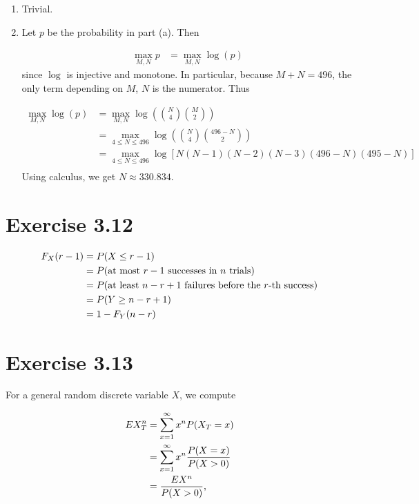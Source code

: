 \documentclass[12pt,letterpaper,reqno]{amsart}
\numberwithin{equation}{subsection}
\begin{document}
\begin{enumerate}[label=(\alph*),leftmargin=*]
    \item Trivial.
    
    \item Let $p$ be the probability in part (a). Then
    
    \begin{align*}
        \max_{M,N} p &= \max_{M,N} \log(p)
    \end{align*}
    since $\log$ is injective and monotone. In particular, because $M+N = 496$, the only term depending on $M$, $N$ is the numerator. Thus
    
    \begin{align*}
        \max_{M,N} \log(p) &= \max_{M,N} \log \left( \binom{N}{4} \binom{M}{2} \right) \\
        &= \max_{4 \leq N \leq 496} \log \left( \binom{N}{4} \binom{496-N}{2} \right) \\
        &= \max_{4 \leq N \leq 496} \log \left[ N(N-1)(N-2)(N-3)(496-N)(495-N) \right] \\
    \end{align*}
    Using calculus, we get $N \approx 330.834$.
\end{enumerate}

\newpage
\section{Exercise 3.12}

\begin{align*}
    {F_X}\! \left( {r-1} \right) &= {P}\! \left( {X \leq r-1} \right) \\
                     &= {P}\! \left( {\mbox{at most $r-1$ successes in $n$ trials}} \right) \\
                     &= {P}\! \left( {\mbox{at least $n-r+1$ failures before the $r$-th success}} \right) \\
                     &= {P}\! \left( {Y \geq n-r+1} \right) \\
                     &= 1- {F_Y}\! \left( {n-r} \right)
\end{align*}

\newpage
\section{Exercise 3.13}

For a general random discrete variable $X$, we compute

\begin{align}
    EX_T^n &= \sum_{x = 1}^{\infty} x^n {P}\! \left( {X_T = x} \right) \nonumber \\
         &= \sum_{x = 1}^{\infty} x^n \frac{{P}\! \left( {X = x} \right)}{{P}\! \left( {X>0} \right)} \nonumber \\
         &= \frac{EX^n}{{P}\! \left( {X>0} \right)},
\end{align}
\end{document}
